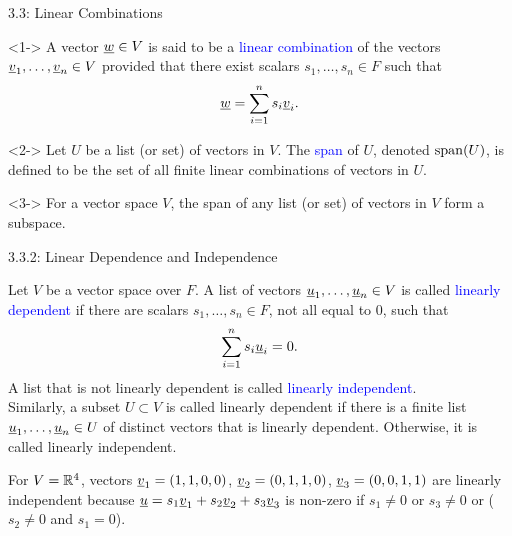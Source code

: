 \documentclass[10pt,letterpaper,english]{beamer}
\begin{document}
\begin{frame}{3.3: Linear Combinations}

\begin{definition}<1->
A vector $\underline{w} \in V$ is said to be a \textcolor{blue}{linear combination} of the vectors $\underline{v}_1, \ldots, \underline{v}_n \in V$ provided that there exist scalars $s_1, \ldots, s_n \in F$ such that
\begin{equation*}
\underline{w} = \sum_{i=1}^n s_i \underline{v}_i.
\end{equation*}
\end{definition}

\begin{definition}<2->
Let $U$ be a list (or set) of vectors in $V$.
The \textcolor{blue}{span} of $U$, denoted $\mathrm{span}(U)$, is defined to be the set of all finite linear combinations of vectors in $U$.
\end{definition}

\begin{example}<3->
For a vector space $V$, the span of any list (or set) of vectors in $V$ form a subspace.
\end{example}

\end{frame}

\begin{frame}{3.3.2: Linear Dependence and Independence}

\begin{definition}
Let $V$ be a vector space over $F$.
A list of vectors $\underline{u}_1, \ldots, \underline{u}_n \in V $ is called \textcolor{blue}{linearly dependent} if there are scalars $s_1, \ldots, s_n \in F$, not all equal to $0$, such that
\begin{equation*}
\sum_{i=1}^n s_i \underline{u}_i = 0.
\end{equation*}
A list that is not linearly dependent is called \textcolor{blue}{linearly independent}. \\[1.5mm]
Similarly, a subset $U \subset V$ is called linearly dependent if there is a finite list $\underline{u}_1, \ldots, \underline{u}_n \in U$ of distinct vectors that is linearly dependent.
Otherwise, it is called linearly independent.
\end{definition}

\begin{example}
For $V=\mathbb{R}^4$, vectors $\underline{v}_1=(1,1,0,0)$, $\underline{v}_2=(0,1,1,0)$, $\underline{v}_3=(0,0,1,1)$ are linearly independent because $\underline{u} = s_1 \underline{v}_1 + s_2  \underline{v}_2 + s_3  \underline{v}_3$ is non-zero if $s_1 \neq 0$ or $s_3 \neq 0$ or ($s_2 \neq 0$ and $s_1 = 0$).
\end{example}

\end{frame}
\end{document}
